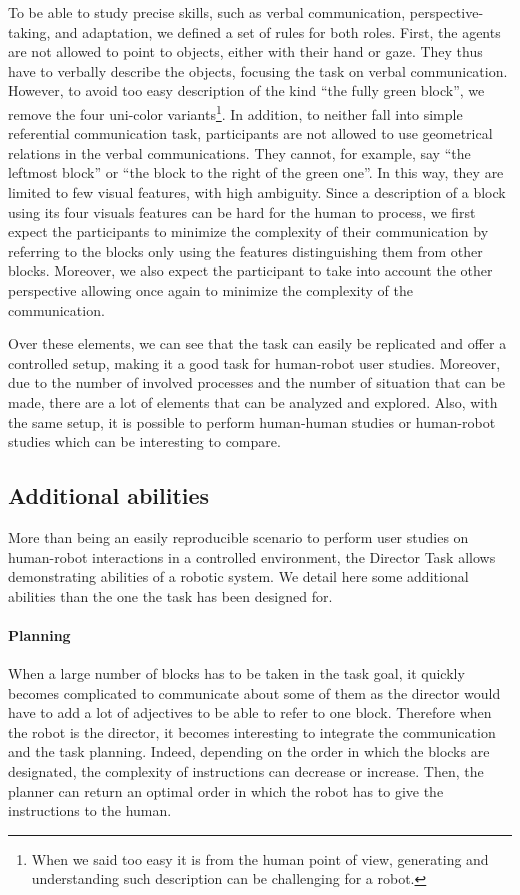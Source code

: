 To be able to study precise skills, such as verbal communication, perspective-taking, and adaptation, we defined a set of rules for both roles. First, the agents are not allowed to point to objects, either with their hand or gaze. They thus have to verbally describe the objects, focusing the task on verbal communication. However, to avoid too easy description of the kind ``the fully green block'', we remove the four uni-color variants\footnote{When we said too easy it is from the human point of view, generating and understanding such description can be challenging for a robot.}. In addition, to neither fall into simple referential communication task, participants are not allowed to use geometrical relations in the verbal communications. They cannot, for example, say ``the leftmost block'' or ``the block to the right of the green one''. In this way, they are limited to few visual features, with high ambiguity. Since a description of a block using its four visuals features can be hard for the human to process, we first expect the participants to minimize the complexity of their communication by referring to the blocks only using the features distinguishing them from other blocks. Moreover, we also expect the participant to take into account the other perspective allowing once again to minimize the complexity of the communication.

Over these elements, we can see that the task can easily be replicated and offer a controlled setup, making it a good task for human-robot user studies. Moreover, due to the number of involved processes and the number of situation that can be made, there are a lot of elements that can be analyzed and explored. Also, with the same setup, it is possible to perform human-human studies or human-robot studies which can be interesting to compare.

\subsection{Additional abilities}

More than being an easily reproducible scenario to perform user studies on human-robot interactions in a controlled environment, the Director Task allows demonstrating abilities of a robotic system. We detail here some additional abilities than the one the task has been designed for.

\paragraph{Planning} When a large number of blocks has to be taken in the task goal, it quickly becomes complicated to communicate about some of them as the director would have to add a lot of adjectives to be able to refer to one block. Therefore when the robot is the director, it becomes interesting to integrate the communication and the task planning. Indeed, depending on the order in which the blocks are designated, the complexity of instructions can decrease or increase. Then, the planner can return an optimal order in which the robot has to give the instructions to the human.

